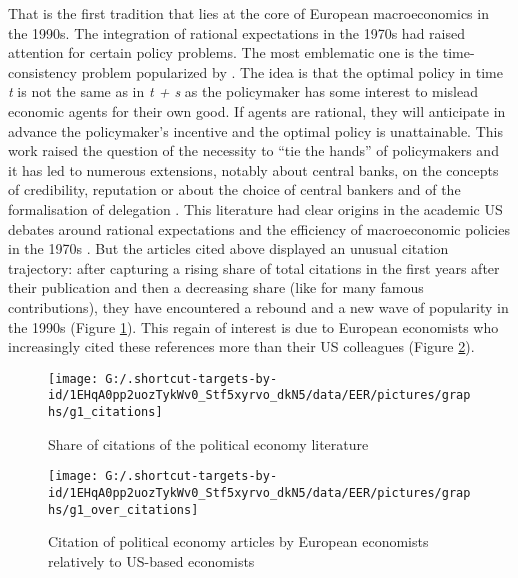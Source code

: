 \documentclass[]{elsarticle} %
\begin{document}
That is the first tradition that lies at the core of European
macroeconomics in the 1990s. The integration of rational expectations in
the 1970s had raised attention for certain policy problems. The most
emblematic one is the time-consistency problem popularized by
\citet{kydland1977}. The idea is that the optimal policy in time
\emph{t} is not the same as in \emph{t + s} as the policymaker has some
interest to mislead economic agents for their own good. If agents are
rational, they will anticipate in advance the policymaker's incentive
and the optimal policy is unattainable. This work raised the question of
the necessity to ``tie the hands'' of policymakers and it has led to
numerous extensions, notably about central banks, on the concepts of
credibility, reputation \citep{barro1983, barro1983c} or about the
choice of central bankers and of the formalisation of delegation
\citep{rogoff1985b}. This literature had clear origins in the academic
US debates around rational expectations and the efficiency of
macroeconomic policies in the 1970s \citep[80-86]{hoover1988}. But the
articles cited above displayed an unusual citation trajectory: after
capturing a rising share of total citations in the first years after
their publication and then a decreasing share (like for many famous
contributions), they have encountered a rebound and a new wave of
popularity in the 1990s (Figure \ref{fig:plot-political-economy}). This
regain of interest is due to European economists who increasingly cited
these references more than their US colleagues (Figure
\ref{fig:plot-political-economy-europe}).

\begin{figure}[h]

{\centering \texttt{[image: G:/.shortcut-targets-by-id/1EHqA0pp2uozTykWv0\_Stf5xyrvo\_dkN5/data/EER/pictures/graphs/g1\_citations]} 

}

\caption{Share of citations of the political economy literature}\label{fig:plot-political-economy}
\end{figure}

\begin{figure}[h]

{\centering \texttt{[image: G:/.shortcut-targets-by-id/1EHqA0pp2uozTykWv0\_Stf5xyrvo\_dkN5/data/EER/pictures/graphs/g1\_over\_citations]} 

}

\caption{Citation of political economy articles by European economists relatively to US-based economists}\label{fig:plot-political-economy-europe}
\end{figure}
\end{document}
